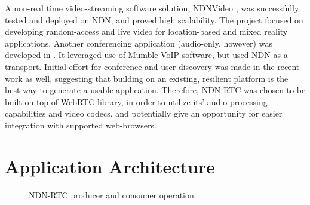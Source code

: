 \documentclass{icn/sig-alternate-2012} %
\newcommand{\ndnrtcName}{NDN-RTC} %
\begin{document}
A non-real time video-streaming software solution, NDNVideo \cite{ndnvideo}, was successfully tested and deployed on NDN, and proved high scalability. The project focused on developing random-access and live video for location-based and mixed reality applications. Another conferencing application (audio-only, however) was developed in \cite{act-tool}. It leveraged use of Mumble VoIP software, but used NDN as a transport. Initial effort for conference and user discovery was made in the recent work as well, suggesting that building on an existing, resilient platform is the best way to generate a usable application. Therefore, \ndnrtcName{} was chosen to be built on top of WebRTC library, in order to utilize its' audio-processing capabilities and video codecs, and potentially give an opportunity for easier integration with supported web-browsers.





\section{Application Architecture}
\label{sec:arch}

\begin{figure}[t!]
\centering
{}\qquad
{}
\caption{\ndnrtcName{} producer and consumer operation.}
\end{figure}
\end{document}
